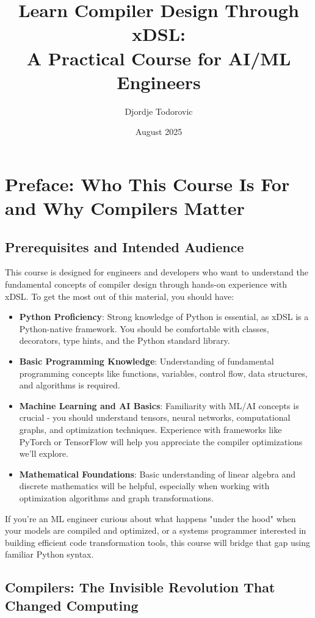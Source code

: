 \documentclass[11pt,a4paper]{article}
\title{Learn Compiler Design Through xDSL:\\
A Practical Course for AI/ML Engineers}
\author{Djordje Todorovic}
\date{August 2025}
\begin{document}
\maketitle

\tableofcontents
\newpage

\section{Preface: Who This Course Is For and Why Compilers Matter}

\subsection{Prerequisites and Intended Audience}

This course is designed for engineers and developers who want to understand the fundamental concepts of compiler design through hands-on experience with xDSL. To get the most out of this material, you should have:

\begin{itemize}
    \item \textbf{Python Proficiency}: Strong knowledge of Python is essential, as xDSL is a Python-native framework. You should be comfortable with classes, decorators, type hints, and the Python standard library.
    \item \textbf{Basic Programming Knowledge}: Understanding of fundamental programming concepts like functions, variables, control flow, data structures, and algorithms is required.
    \item \textbf{Machine Learning and AI Basics}: Familiarity with ML/AI concepts is crucial - you should understand tensors, neural networks, computational graphs, and optimization techniques. Experience with frameworks like PyTorch or TensorFlow will help you appreciate the compiler optimizations we'll explore.
    \item \textbf{Mathematical Foundations}: Basic understanding of linear algebra and discrete mathematics will be helpful, especially when working with optimization algorithms and graph transformations.
\end{itemize}

If you're an ML engineer curious about what happens "under the hood" when your models are compiled and optimized, or a systems programmer interested in building efficient code transformation tools, this course will bridge that gap using familiar Python syntax.

\subsection{Compilers: The Invisible Revolution That Changed Computing}
\end{document}
